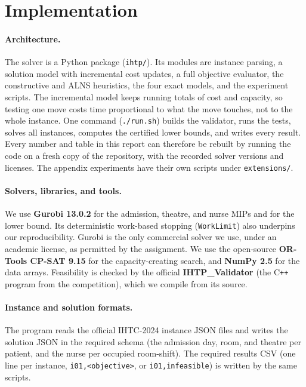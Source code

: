 \documentclass[11pt]{article}
\begin{document}
	\section{Implementation}\label{sec:impl}

	\paragraph{Architecture.}
	The solver is a Python package (\texttt{ihtp/}). Its modules are instance parsing, a solution model with incremental cost updates, a full objective evaluator, the constructive and ALNS heuristics, the four exact models, and the experiment scripts. The incremental model keeps running
	totals of cost and capacity, so testing one move costs time proportional to what the move touches,
	not to the whole instance. One command (\texttt{./run.sh}) builds the validator, runs the tests,
	solves all instances, computes the certified lower bounds, and writes every result. Every number
	and table in this report can therefore be rebuilt by running the code on a fresh copy of the
	repository, with the recorded solver versions and licenses. The appendix experiments have their
	own scripts under \texttt{extensions/}.
	
	\paragraph{Solvers, libraries, and tools.}
	We use \textbf{Gurobi 13.0.2} for the admission, theatre, and nurse MIPs and for the lower bound. Its deterministic work-based stopping (\texttt{WorkLimit}) also underpins our reproducibility.
	Gurobi is the only commercial solver we use, under an academic license, as permitted
	by the assignment. We use the open-source \textbf{OR-Tools CP-SAT 9.15} for the capacity-creating
	search, and \textbf{NumPy 2.5} for the data arrays. Feasibility is checked by the official
	\textbf{IHTP\_Validator} \citep{ihtc2024site} (the C\texttt{++} program from the competition), which we compile from its
	source.
	
	\paragraph{Instance and solution formats.}
	The program reads the official IHTC-2024 instance JSON files \citep{ihtc2024site} and writes the solution JSON in the
	required schema (the admission day, room, and theatre per patient, and the nurse per occupied
	room-shift). The required results CSV (one line per instance, \texttt{i01,<objective>}, or \texttt{i01,infeasible}) is written by the same scripts.
	
\end{document}
